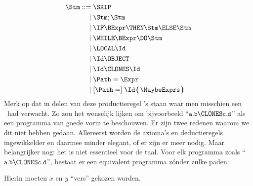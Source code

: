 %
\begin{align*}
  \Stm \GrammarDef \SKIP \\
  \GrammarOr \Stm; \Stm \\
  \GrammarOr \IF \BExpr \THEN \Stm \ELSE \Stm \\
  \GrammarOr \WHILE \BExpr \DO \Stm \\
  \GrammarOr \LOCAL \Id \\
  \GrammarOr \Id \OBJECT \\
  \GrammarOr \Id \CLONES \Id \\
  \GrammarOr \Path = \Expr \\
  \GrammarOr \GrammarOpt{\Path =} \Id\,\pmb{(}\,\MaybeExprs\,\pmb{)}
\end{align*}
%
Merk op dat in delen van deze productieregel \Id's staan waar men misschien een \Path\ had verwacht. Zo zou het wenselijk lijken om bijvoorbeeld ``$\id{a}.\id{b} \CLONES \id{c}.\id{d}$'' als een programma van goede vorm te beschouwen. Er zijn twee redenen waarom we dit niet hebben gedaan. Allereerst worden de axioma's en deductieregels ingewikkelder en daarmee minder elegant, of er zijn er meer nodig. Maar belangrijker nog: het is niet essentieel voor de taal. Voor elk programma zoals ``$\id{a}.\id{b} \CLONES \id{c}.\id{d}$'', bestaat er een equivalent programma zónder zulke paden:

\begin{minipage}[t]{.5\textwidth}
  \newCodeFragment
\end{minipage}
\begin{minipage}[t]{.5\textwidth}
  \newCodeFragment
\end{minipage}

Hierin moeten $x$ en $y$ ``vers'' gekozen worden.

